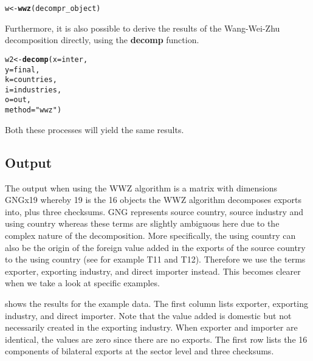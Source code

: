 \documentclass[a4paper]{article}\usepackage[]{graphicx}\usepackage[]{color}
\makeatletter
\newcommand{\hlstr}[1]{\textcolor[rgb]{0.192,0.494,0.8}{#1}}%
\newcommand{\hlstd}[1]{\textcolor[rgb]{0.345,0.345,0.345}{#1}}%
\newcommand{\hlkwb}[1]{\textcolor[rgb]{0.69,0.353,0.396}{#1}}%
\newcommand{\hlkwc}[1]{\textcolor[rgb]{0.333,0.667,0.333}{#1}}%
\newcommand{\hlkwd}[1]{\textcolor[rgb]{0.737,0.353,0.396}{\textbf{#1}}}%
\newenvironment{kframe}{%
 \def\at@end@of@kframe{}%
 \ifinner\ifhmode%
  \def\at@end@of@kframe{\end{minipage}}%
  \begin{minipage}{\columnwidth}%
 \fi\fi%
 \def\FrameCommand##1{\hskip\@totalleftmargin \hskip-\fboxsep
 \colorbox{shadecolor}{##1}\hskip-\fboxsep
     \hskip-\linewidth \hskip-\@totalleftmargin \hskip\columnwidth}%
 \MakeFramed {\advance\hsize-\width
   \@totalleftmargin\z@ \linewidth\hsize
   \@setminipage}}%
 {\par\unskip\endMakeFramed%
 \at@end@of@kframe}
\newenvironment{knitrout}{}{} %
\makeatother
\begin{document}
\begin{knitrout}
\color{fgcolor}\begin{kframe}
\begin{alltt}
\hlstd{w} \hlkwb{<-} \hlkwd{wwz}\hlstd{(decompr_object)}
\end{alltt}
\end{kframe}
\end{knitrout}

Furthermore, it is also possible to derive the results of the Wang-Wei-Zhu decomposition directly, using the \textbf{decomp} function.

\begin{knitrout}
\color{fgcolor}\begin{kframe}
\begin{alltt}
\hlstd{w2} \hlkwb{<-}  \hlkwd{decomp}\hlstd{(} \hlkwc{x} \hlstd{= inter,}
               \hlkwc{y} \hlstd{= final,}
               \hlkwc{k} \hlstd{= countries,}
               \hlkwc{i} \hlstd{= industries,}
               \hlkwc{o} \hlstd{= out,}
               \hlkwc{method} \hlstd{=} \hlstr{"wwz"} \hlstd{)}
\end{alltt}
\end{kframe}
\end{knitrout}

Both these processes will yield the same results.

\subsection{Output}
The output when using the WWZ algorithm is a matrix with dimensions GNGx19 whereby 19 is the 16 objects the WWZ algorithm decomposes exports into, plus three checksums. GNG represents source country, source industry and using country whereas these terms are slightly ambiguous here due to the complex nature of the decomposition. More specifically, the using country can also be the origin of the foreign value added in the exports of the source country to the using country (see for example T11 and T12). Therefore we use the terms exporter, exporting industry, and direct importer instead. This becomes clearer when we take a look at specific examples.

 shows the results for the example data. The first column lists exporter, exporting industry, and direct importer. Note that the value added is domestic but not necessarily created in the exporting industry. When exporter and importer are identical, the values are zero since there are no exports. The first row lists the 16 components of bilateral exports at the sector level and three checksums.
\end{document}
